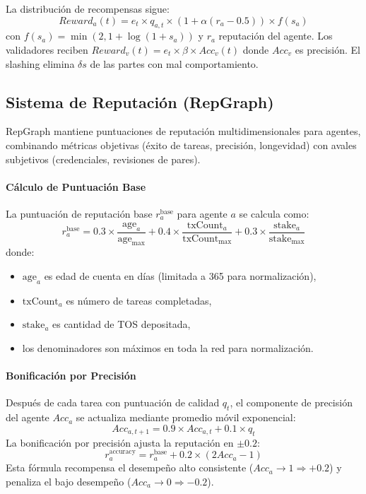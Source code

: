 \documentclass[11pt]{article}
\begin{document}
La distribución de recompensas sigue:
\begin{equation}
Reward_a(t) = e_t \times q_{a,t} \times \left(1 + \alpha (r_a - 0.5)\right) \times f(s_a)
\end{equation}
con $f(s_a) = \min(2, 1 + \log(1+s_a))$ y $r_a$ reputación del agente. Los validadores reciben $Reward_v(t) = e_t \times \beta \times Acc_v(t)$ donde $Acc_v$ es precisión. El slashing elimina $\delta s$ de las partes con mal comportamiento.

\subsection{Sistema de Reputación (RepGraph)}
\label{sec:reputation}
RepGraph mantiene puntuaciones de reputación multidimensionales para agentes, combinando métricas objetivas (éxito de tareas, precisión, longevidad) con avales subjetivos (credenciales, revisiones de pares).

\paragraph{Cálculo de Puntuación Base} La puntuación de reputación base $r_a^{\text{base}}$ para agente $a$ se calcula como:
\begin{equation}
r_a^{\text{base}} = 0.3 \times \frac{\text{age}_a}{\text{age}_{\max}} + 0.4 \times \frac{\text{txCount}_a}{\text{txCount}_{\max}} + 0.3 \times \frac{\text{stake}_a}{\text{stake}_{\max}}
\end{equation}
donde:
\begin{itemize}[noitemsep]
  \item $\text{age}_a$ es edad de cuenta en días (limitada a 365 para normalización),
  \item $\text{txCount}_a$ es número de tareas completadas,
  \item $\text{stake}_a$ es cantidad de TOS depositada,
  \item los denominadores son máximos en toda la red para normalización.
\end{itemize}

\paragraph{Bonificación por Precisión} Después de cada tarea con puntuación de calidad $q_t$, el componente de precisión del agente $Acc_a$ se actualiza mediante promedio móvil exponencial:
\begin{equation}
Acc_{a,t+1} = 0.9 \times Acc_{a,t} + 0.1 \times q_t
\end{equation}
La bonificación por precisión ajusta la reputación en $\pm 0.2$:
\begin{equation}
r_a^{\text{accuracy}} = r_a^{\text{base}} + 0.2 \times (2 Acc_a - 1)
\end{equation}
Esta fórmula recompensa el desempeño alto consistente ($Acc_a \to 1 \Rightarrow +0.2$) y penaliza el bajo desempeño ($Acc_a \to 0 \Rightarrow -0.2$).
\end{document}
